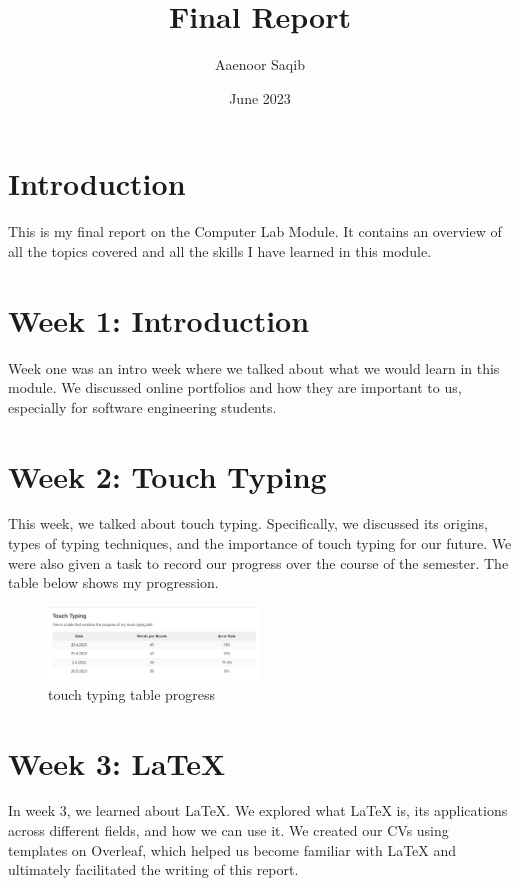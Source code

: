 \documentclass{article}
\title{Final Report}
\author{Aaenoor Saqib}
\date{June 2023}
\begin{document}
\maketitle

\section{Introduction}
This is my final report on the Computer Lab Module. It contains an overview of all the topics covered and all the skills I have learned in this module.

\section{Week 1: Introduction}
Week one was an intro week where we talked about what we would learn in this module. We discussed online portfolios and how they are important to us, especially for software engineering students.

\section{Week 2: Touch Typing}
This week, we talked about touch typing. Specifically, we discussed its origins, types of typing techniques, and the importance of touch typing for our future. We were also given a task to record our progress over the course of the semester. The table below shows my progression.

\begin{figure}[ht]
  \centering
  \includegraphics[width=0.5\textwidth]{touch typing table ss}
  \caption{touch typing table progress}
  \label{fig:week2_image}
\end{figure}

\section{Week 3: LaTeX}
In week 3, we learned about LaTeX. We explored what LaTeX is, its applications across different fields, and how we can use it. We created our CVs using templates on Overleaf, which helped us become familiar with LaTeX and ultimately facilitated the writing of this report.
\end{document}
